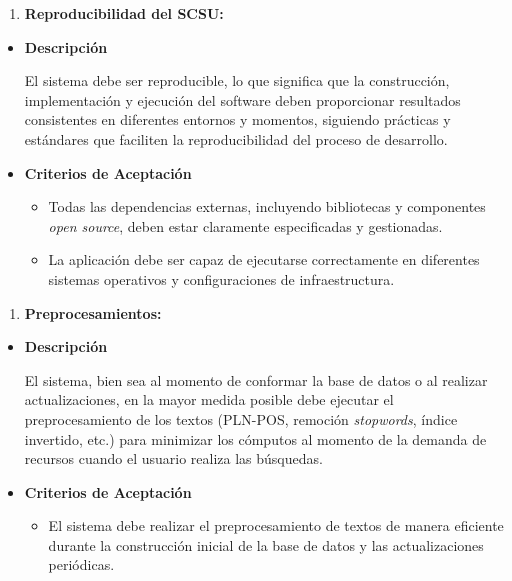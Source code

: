 \documentclass[
  12pt,
  openany]{book}
\providecommand{\tightlist}{%
  \setlength{\itemsep}{0pt}\setlength{\parskip}{0pt}}
\begin{document}
\begin{enumerate}
\def\labelenumi{\arabic{enumi}.}
\setcounter{enumi}{2}
\tightlist
\item
  \textbf{Reproducibilidad del SCSU:}
\end{enumerate}

\begin{itemize}
\item
  \textbf{Descripción}

  El sistema debe ser reproducible, lo que significa que la construcción, implementación y ejecución del software deben proporcionar resultados consistentes en diferentes entornos y momentos, siguiendo prácticas y estándares que faciliten la reproducibilidad del proceso de desarrollo.
\item
  \textbf{Criterios de Aceptación}

  \begin{itemize}
  \item
    Todas las dependencias externas, incluyendo bibliotecas y componentes \emph{open source}, deben estar claramente especificadas y gestionadas.
  \item
    La aplicación debe ser capaz de ejecutarse correctamente en diferentes sistemas operativos y configuraciones de infraestructura.
  \end{itemize}
\end{itemize}

\begin{enumerate}
\def\labelenumi{\arabic{enumi}.}
\setcounter{enumi}{3}
\tightlist
\item
  \textbf{Preprocesamientos:}
\end{enumerate}

\begin{itemize}
\item
  \textbf{Descripción}

  El sistema, bien sea al momento de conformar la base de datos o al realizar actualizaciones, en la mayor medida posible debe ejecutar el preprocesamiento de los textos (PLN-POS, remoción \emph{stopwords}, índice invertido, etc.) para minimizar los cómputos al momento de la demanda de recursos cuando el usuario realiza las búsquedas.
\item
  \textbf{Criterios de Aceptación}

  \begin{itemize}
  \tightlist
  \item
    El sistema debe realizar el preprocesamiento de textos de manera eficiente durante la construcción inicial de la base de datos y las actualizaciones periódicas.
  \end{itemize}
\end{itemize}
\end{document}
